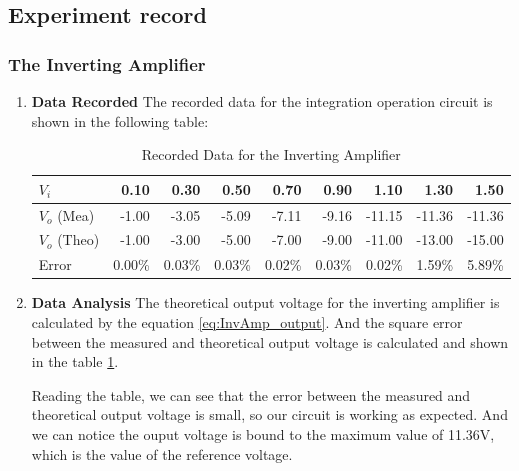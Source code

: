 \subsection{Experiment record}
    \subsubsection{The Inverting Amplifier}
    \begin{enumerate}[I]
        \item \textbf{Data Recorded}\newline
            The recorded data for the integration operation circuit is shown in the following table:
            \begin{table}[H]
                \centering
                \begin{tabular}{l|rrrrrrrr}
                \toprule
                $V_i$ & 0.10  & 0.30  & 0.50  & 0.70  & 0.90  & 1.10  & 1.30  & 1.50 \\
                \midrule
                $V_o$ (Mea) & -1.00 & -3.05 & -5.09 & -7.11 & -9.16 & -11.15 & -11.36 & -11.36 \\
                \midrule
                $V_o$ (Theo) & -1.00 & -3.00 & -5.00 & -7.00 & -9.00 & -11.00 & -13.00 & -15.00 \\
                Error & 0.00\% & 0.03\% & 0.03\% & 0.02\% & 0.03\% & 0.02\% & 1.59\% & 5.89\% \\
                \bottomrule
                \end{tabular}%
                \caption{Recorded Data for the Inverting Amplifier}
                \label{tab:InvAmp}
            \end{table}
        \item \textbf{Data Analysis}\newline
            The theoretical output voltage for the inverting amplifier is calculated by the equation \ref{eq:InvAmp_output}. And the square error between the measured and theoretical output voltage is calculated and shown in the table \ref{tab:InvAmp}.\par
            
            Reading the table, we can see that the error between the measured and theoretical output voltage is small, so our circuit is working as expected. And we can notice the ouput voltage is bound to the maximum value of 11.36V, which is the value of the reference voltage.\par
    \end{enumerate}
    
